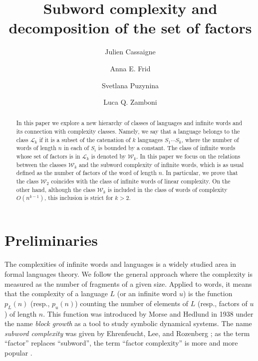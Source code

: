 \documentclass[runningheads,envcountsect,envcountsame]{llncs}
\begin{document}
\author{Julien Cassaigne \and Anna E. Frid \and Svetlana Puzynina \and Luca Q. Zamboni }
\title{Subword complexity and decomposition of the set of factors}


\maketitle

\begin{abstract}
In this paper we explore a new hierarchy of classes of languages
and infinite words and its connection with complexity
classes. Namely, we say that a language belongs to the class $\mathcal L_k$ if it is a
subset of the catenation of $k$ languages $S_1\cdots S_k$, where the number of words of
length $n$ in each of $S_i$ is bounded by a constant.
The class of infinite words whose set of factors is in $\mathcal L_k$ is denoted by
$\mathcal W_k$. In this paper we focus on the relations between the classes $\mathcal W_k$ and the subword complexity
of infinite words, which is as usual defined as the number of factors of the word of length $n$. In particular, we prove that the class $\mathcal
 W_{2}$ coincides with the class of
 infinite words of linear complexity. On the
other hand, although the class $\mathcal W_{k}$
is included in the class of words of complexity $O(n^{k-1})$, this
inclusion is strict for $k> 2$.
\end{abstract}

\section{Preliminaries}

The complexities of infinite words and languages is a widely
studied area in formal languages theory. We follow the general approach where the complexity is measured as the number of fragments of a given size. Applied to words, it means that the complexity of a language $L$ (or an infinite word $u$) is the function $p_L(n)$ (resp., $p_u(n)$) counting the number of elements of $L$ (resp., factors of $u$) of length $n$. This function was introduced
by  Morse and Hedlund in 1938 \cite{MoHe1} under the name
\emph{block growth} as a tool to study symbolic dynamical
systems. The name \emph{subword complexity} was given by Ehrenfeucht,
Lee, and Rozenberg \cite{elr}; as the term ``factor'' replaces ``subword'', the term ``factor complexity'' is more and more popular \cite{cas_livre}.
\end{document}
